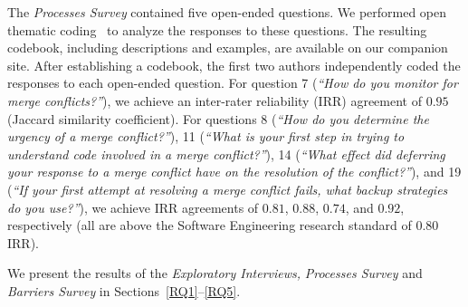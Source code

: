 The \textit{Processes Survey} contained five open-ended questions.
We performed open thematic coding~\cite{fereday2006demonstrating} to analyze the responses to these questions.
The resulting codebook, including descriptions and examples, are available on our companion site.
After establishing a codebook, the first two authors independently coded the responses to each open-ended question.
For question 7 (\textit{``How do you monitor for merge conflicts?''}), we achieve an inter-rater reliability (IRR) agreement of $0.95$ (Jaccard similarity coefficient).
For questions 8 (\textit{``How do you determine the urgency of a merge conflict?''}), 11 (\textit{``What is your first step in trying to understand code involved in a merge conflict?''}), 14 (\textit{``What effect did deferring your response to a merge conflict have on the resolution of the conflict?''}), and 19 (\textit{``If your first attempt at resolving a merge conflict fails, what backup strategies do you use?''}), we achieve IRR agreements of $0.81$, $0.88$, $0.74$, and $0.92$, respectively (all are above the Software Engineering research standard of $0.80$ IRR).

We present the results of the \textit{Exploratory Interviews,} \textit{Processes Survey} and \textit{Barriers Survey} in Sections~\ref{RQ1}--\ref{RQ5}.

